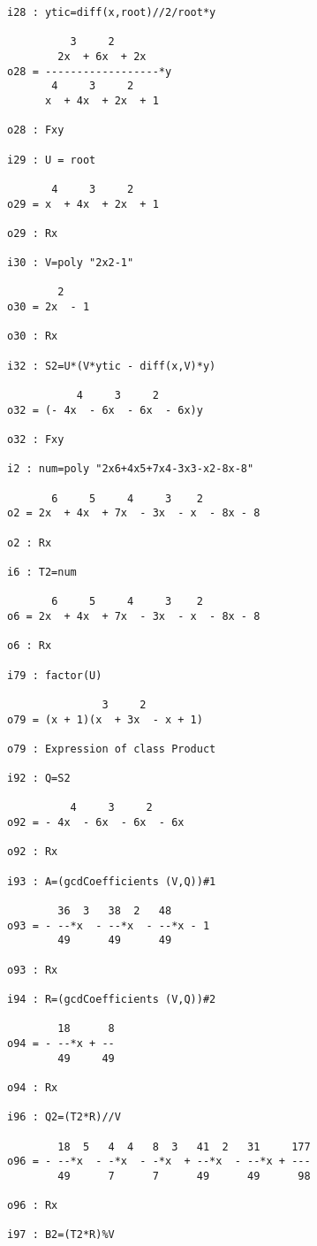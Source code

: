 {\small\begin{verbatim}
i28 : ytic=diff(x,root)//2/root*y

          3     2
        2x  + 6x  + 2x
o28 = ------------------*y
       4     3     2
      x  + 4x  + 2x  + 1

o28 : Fxy

i29 : U = root

       4     3     2
o29 = x  + 4x  + 2x  + 1

o29 : Rx

i30 : V=poly "2x2-1"

        2
o30 = 2x  - 1

o30 : Rx

i32 : S2=U*(V*ytic - diff(x,V)*y)

           4     3     2
o32 = (- 4x  - 6x  - 6x  - 6x)y

o32 : Fxy

i2 : num=poly "2x6+4x5+7x4-3x3-x2-8x-8"

       6     5     4     3    2
o2 = 2x  + 4x  + 7x  - 3x  - x  - 8x - 8

o2 : Rx

i6 : T2=num

       6     5     4     3    2
o6 = 2x  + 4x  + 7x  - 3x  - x  - 8x - 8

o6 : Rx

i79 : factor(U)

               3     2
o79 = (x + 1)(x  + 3x  - x + 1)

o79 : Expression of class Product

i92 : Q=S2

          4     3     2
o92 = - 4x  - 6x  - 6x  - 6x

o92 : Rx

i93 : A=(gcdCoefficients (V,Q))#1

        36  3   38  2   48
o93 = - --*x  - --*x  - --*x - 1
        49      49      49

o93 : Rx

i94 : R=(gcdCoefficients (V,Q))#2

        18      8
o94 = - --*x + --
        49     49

o94 : Rx

i96 : Q2=(T2*R)//V

        18  5   4  4   8  3   41  2   31     177
o96 = - --*x  - -*x  - -*x  + --*x  - --*x + ---
        49      7      7      49      49      98

o96 : Rx

i97 : B2=(T2*R)%V


\end{verbatim}}
